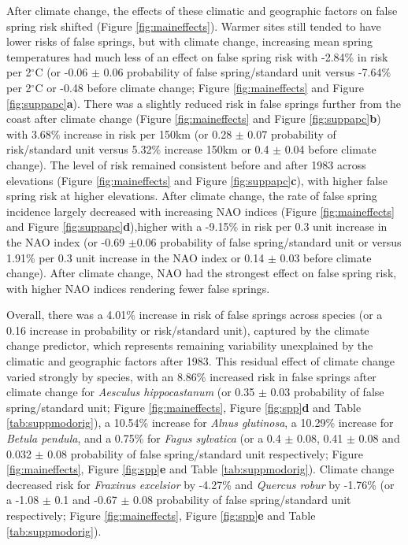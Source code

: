 \documentclass{article}\usepackage[]{graphicx}\usepackage[]{color}
\begin{document}
After climate change, the effects of these climatic and geographic factors on false spring risk shifted (Figure \ref{fig:maineffects}). Warmer sites still tended to have lower risks of false springs, but with climate change, increasing mean spring temperatures had much less of an effect on false spring risk with -2.84\% in risk per 2$^{\circ}$C (or -0.06 $\pm$ 0.06 probability of false spring/standard unit versus -7.64\% per 2$^{\circ}$C or -0.48 before climate change; Figure \ref{fig:maineffects} and Figure \ref{fig:suppapc}\textbf{a}). There was a slightly reduced risk in false springs further from the coast after climate change (Figure \ref{fig:maineffects} and Figure \ref{fig:suppapc}\textbf{b}) with 3.68\% increase in risk per 150km (or 0.28 $\pm$ 0.07 probability of risk/standard unit versus 5.32\% increase 150km or 0.4 $\pm$ 0.04 before climate change). The level of risk remained consistent before and after 1983 across elevations (Figure \ref{fig:maineffects} and Figure \ref{fig:suppapc}\textbf{c}), with higher false spring risk at higher elevations. After climate change, the rate of false spring incidence largely decreased with increasing NAO indices (Figure \ref{fig:maineffects} and Figure \ref{fig:suppapc}\textbf{d}),higher with a -9.15\% in risk per 0.3 unit increase in the NAO index (or -0.69 $\pm$0.06 probability of false spring/standard unit or versus 1.91\% per 0.3 unit increase in the NAO index or 0.14 $\pm$ 0.03 before climate change). After climate change, NAO had the strongest effect on false spring risk, with higher NAO indices rendering fewer false springs.

Overall, there was a 4.01\% increase in risk of false springs across species (or a 0.16 increase in probability or risk/standard unit), captured by the climate change predictor, which represents remaining variability unexplained by the climatic and geographic factors after 1983. This residual effect of climate change varied strongly by species, with an 8.86\% increased risk in false springs after climate change for \textit{Aesculus hippocastanum} (or 0.35 $\pm$ 0.03 probability of false spring/standard unit; Figure \ref{fig:maineffects}, Figure \ref{fig:spp}\textbf{d} and Table \ref{tab:suppmodorig}), a 10.54\% increase for \textit{Alnus glutinosa}, a 10.29\% increase for \textit{Betula pendula}, and a 0.75\% for \textit{Fagus sylvatica} (or a 0.4 $\pm$ 0.08, 0.41 $\pm$ 0.08 and 0.032 $\pm$ 0.08 probability of false spring/standard unit respectively; Figure \ref{fig:maineffects}, Figure \ref{fig:spp}\textbf{e} and Table \ref{tab:suppmodorig}). Climate change decreased risk for \textit{Fraxinus excelsior} by -4.27\% and \textit{Quercus robur} by -1.76\% (or a -1.08 $\pm$ 0.1 and -0.67 $\pm$ 0.08 probability of false spring/standard unit respectively; Figure \ref{fig:maineffects}, Figure \ref{fig:spp}\textbf{e} and Table \ref{tab:suppmodorig}).  
\end{document}
